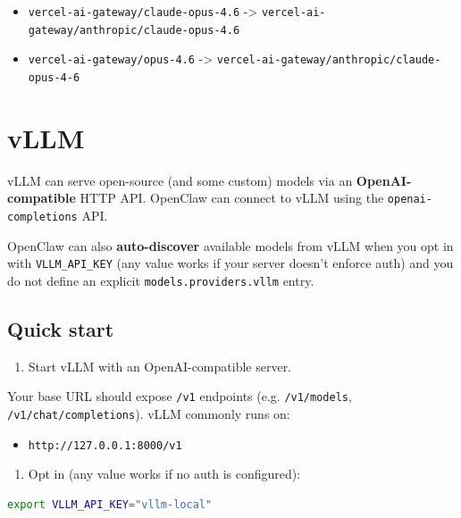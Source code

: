 \begin{itemize}
  \item \texttt{vercel-ai-gateway/claude-opus-4.6} -> \texttt{vercel-ai-gateway/anthropic/claude-opus-4.6}
  \item \texttt{vercel-ai-gateway/opus-4.6} -> \texttt{vercel-ai-gateway/anthropic/claude-opus-4-6}
\end{itemize}



\clearpage

\section{vLLM}


vLLM can serve open-source (and some custom) models via an \textbf{OpenAI-compatible} HTTP API. OpenClaw can connect to vLLM using the \texttt{openai-completions} API.

OpenClaw can also \textbf{auto-discover} available models from vLLM when you opt in with \texttt{VLLM\_API\_KEY} (any value works if your server doesn’t enforce auth) and you do not define an explicit \texttt{models.providers.vllm} entry.

\subsection{Quick start}


\begin{enumerate}
  \item Start vLLM with an OpenAI-compatible server.
\end{enumerate}


Your base URL should expose \texttt{/v1} endpoints (e.g. \texttt{/v1/models}, \texttt{/v1/chat/completions}). vLLM commonly runs on:

\begin{itemize}
  \item \texttt{http://127.0.0.1:8000/v1}
\end{itemize}


\begin{enumerate}
  \item Opt in (any value works if no auth is configured):
\end{enumerate}


\begin{lstlisting}[language=bash]
export VLLM_API_KEY="vllm-local"
\end{lstlisting}


